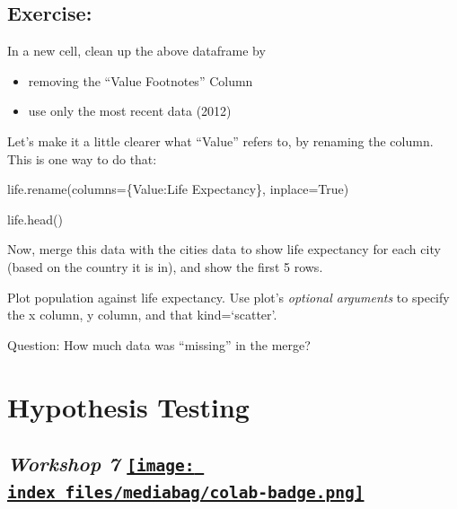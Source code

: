 \documentclass[
  letterpaper,
  DIV=11,
  numbers=noendperiod]{scrreprt}
\newenvironment{Shaded}{\begin{snugshade}}{\end{snugshade}}
\newcommand{\NormalTok}[1]{\textcolor[rgb]{0.00,0.23,0.31}{#1}}
\newcommand{\OperatorTok}[1]{\textcolor[rgb]{0.37,0.37,0.37}{#1}}
\newcommand{\StringTok}[1]{\textcolor[rgb]{0.13,0.47,0.30}{#1}}
\newcommand{\VariableTok}[1]{\textcolor[rgb]{0.07,0.07,0.07}{#1}}
\providecommand{\tightlist}{%
  \setlength{\itemsep}{0pt}\setlength{\parskip}{0pt}}\usepackage{longtable,booktabs,array}
\begin{document}
\hypertarget{exercise-20}{%
\section{Exercise:}\label{exercise-20}}

In a new cell, clean up the above dataframe by

\begin{itemize}
\tightlist
\item
  removing the ``Value Footnotes'' Column
\item
  use only the most recent data (2012)
\end{itemize}

Let's make it a little clearer what ``Value'' refers to, by renaming the
column. This is one way to do that:

\begin{Shaded}
\begin{Highlighting}[]
\NormalTok{life.rename(columns}\OperatorTok{=}\NormalTok{\{}\StringTok{\textquotesingle{}Value\textquotesingle{}}\NormalTok{:}\StringTok{\textquotesingle{}Life Expectancy\textquotesingle{}}\NormalTok{\}, inplace}\OperatorTok{=}\VariableTok{True}\NormalTok{)}
\end{Highlighting}
\end{Shaded}

\begin{Shaded}
\begin{Highlighting}[]
\NormalTok{life.head()}
\end{Highlighting}
\end{Shaded}

Now, merge this data with the cities data to show life expectancy for
each city (based on the country it is in), and show the first 5 rows.

Plot population against life expectancy. Use plot's \emph{optional
arguments} to specify the x column, y column, and that kind=`scatter'.

Question: How much data was ``missing'' in the merge?


\hypertarget{hypothesis-testing}{%
\chapter{Hypothesis Testing}\label{hypothesis-testing}}

\hypertarget{workshop-7-open-in-colab}{%
\section[\emph{Workshop 7} ]{\texorpdfstring{\emph{Workshop 7}
\href{https://colab.research.google.com/github/oballinger/QM2/blob/main/notebooks/W07.\%20Hypothesis\%20Testing.ipynb}{\protect\texttt{[image: index\_files/mediabag/colab-badge.png]}}}{Workshop 7 Open In Colab}}\label{workshop-7-open-in-colab}}
\end{document}
